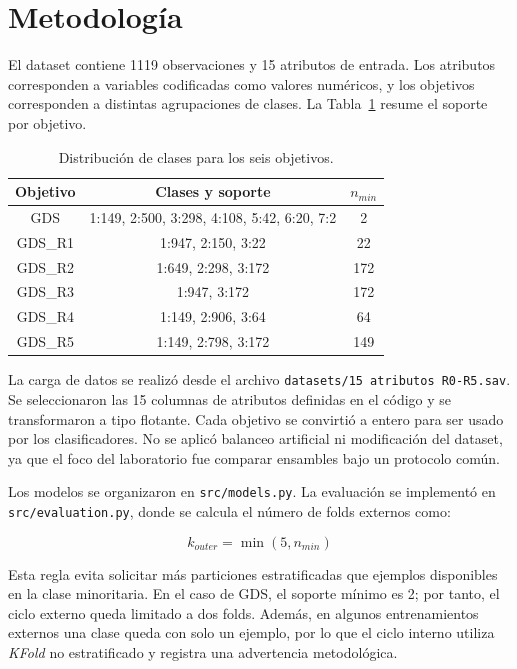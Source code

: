\documentclass[conference]{IEEEtran}
\begin{document}
\section{Metodología}
El dataset contiene 1119 observaciones y 15 atributos de entrada. Los atributos corresponden a variables codificadas como valores numéricos, y los objetivos corresponden a distintas agrupaciones de clases. La Tabla~\ref{tab:distribucion} resume el soporte por objetivo.

\begin{table}[!h]
\centering
\begin{tabular}{|c|c|c|}
\hline
\textbf{Objetivo} & \textbf{Clases y soporte} & \textbf{$n_{min}$} \\
\hline
GDS & 1:149, 2:500, 3:298, 4:108, 5:42, 6:20, 7:2 & 2 \\
GDS\_R1 & 1:947, 2:150, 3:22 & 22 \\
GDS\_R2 & 1:649, 2:298, 3:172 & 172 \\
GDS\_R3 & 1:947, 3:172 & 172 \\
GDS\_R4 & 1:149, 2:906, 3:64 & 64 \\
GDS\_R5 & 1:149, 2:798, 3:172 & 149 \\
\hline
\end{tabular}
\caption{Distribución de clases para los seis objetivos.}
\label{tab:distribucion}
\end{table}

La carga de datos se realizó desde el archivo \texttt{datasets/15 atributos R0-R5.sav}. Se seleccionaron las 15 columnas de atributos definidas en el código y se transformaron a tipo flotante. Cada objetivo se convirtió a entero para ser usado por los clasificadores. No se aplicó balanceo artificial ni modificación del dataset, ya que el foco del laboratorio fue comparar ensambles bajo un protocolo común.

Los modelos se organizaron en \texttt{src/models.py}. La evaluación se implementó en \texttt{src/evaluation.py}, donde se calcula el número de folds externos como:

\begin{equation}
k_{outer} = \min(5, n_{min})
\end{equation}

Esta regla evita solicitar más particiones estratificadas que ejemplos disponibles en la clase minoritaria. En el caso de GDS, el soporte mínimo es 2; por tanto, el ciclo externo queda limitado a dos folds. Además, en algunos entrenamientos externos una clase queda con solo un ejemplo, por lo que el ciclo interno utiliza \textit{KFold} no estratificado y registra una advertencia metodológica.
\end{document}
